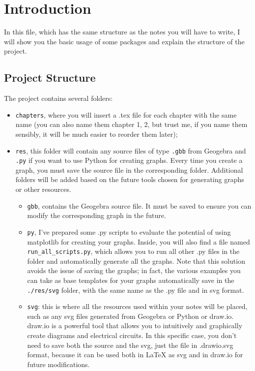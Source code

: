 \chapter{Introduction}

In this file, which has the same structure as the notes you will have to write, I will show you the basic usage of some packages and explain the structure of the project.

\section{Project Structure}

The project contains several folders:
\begin{itemize}
	\item \texttt{chapters}, where you will insert a .tex file for each chapter with the same name (you can also name them chapter 1, 2, but trust me, if you name them sensibly, it will be much easier to reorder them later);
	\item \texttt{res}, this folder will contain any source files of type \texttt{.gbb} from Geogebra and \texttt{.py} if you want to use Python for creating graphs. Every time you create a graph, you must save the source file in the corresponding folder. Additional folders will be added based on the future tools chosen for generating graphs or other resources.
	\begin{itemize}
		\item \texttt{gbb}, contains the Geogebra source file. It must be saved to ensure you can modify the corresponding graph in the future.
		\item \texttt{py}, I’ve prepared some .py scripts to evaluate the potential of using matplotlib for creating your graphs. Inside, you will also find a file named \texttt{run\_all\_scripts.py}, which allows you to run all other .py files in the folder and automatically generate all the graphs. Note that this solution avoids the issue of saving the graphs; in fact, the various examples you can take as base templates for your graphs automatically save in the \texttt{./res/svg} folder, with the same name as the .py file and in svg format.
		\item \texttt{svg}: this is where all the resources used within your notes will be placed, such as any svg files generated from Geogebra or Python or draw.io. draw.io is a powerful tool that allows you to intuitively and graphically create diagrams and electrical circuits. In this specific case, you don’t need to save both the source and the svg, just the file in .drawio.svg format, because it can be used both in LaTeX as svg and in draw.io for future modifications.

\end{itemize}
\end{itemize}
